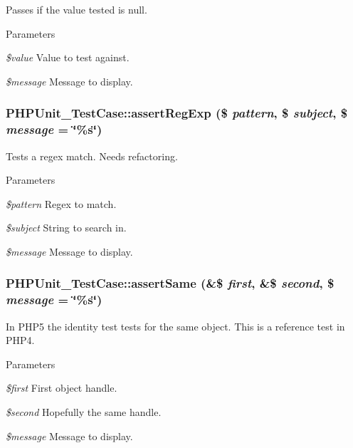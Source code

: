 \label{class_p_h_p_unit___test_case_ad8562d55d3341b088a6d90d38c1024e9}
Passes if the value tested is null. 
\begin{DoxyParams}{Parameters}
\item[{\em \$value}]Value to test against. \item[{\em \$message}]Message to display. \end{DoxyParams}
\hypertarget{class_p_h_p_unit___test_case_a2b02612d6eae4fc5ff14621019fff7e5}{
\subsubsection[{assertRegExp}]{\setlength{\rightskip}{0pt plus 5cm}PHPUnit\_\-TestCase::assertRegExp (\$ {\em pattern}, \/  \$ {\em subject}, \/  \$ {\em message} = {\ttfamily \char`\"{}\%s\char`\"{}})}}
\label{class_p_h_p_unit___test_case_a2b02612d6eae4fc5ff14621019fff7e5}
Tests a regex match. Needs refactoring. 
\begin{DoxyParams}{Parameters}
\item[{\em \$pattern}]Regex to match. \item[{\em \$subject}]String to search in. \item[{\em \$message}]Message to display. \end{DoxyParams}
\hypertarget{class_p_h_p_unit___test_case_a707c89ec40005bbf0cd002509c276ab2}{
\subsubsection[{assertSame}]{\setlength{\rightskip}{0pt plus 5cm}PHPUnit\_\-TestCase::assertSame (\&\$ {\em first}, \/  \&\$ {\em second}, \/  \$ {\em message} = {\ttfamily \char`\"{}\%s\char`\"{}})}}
\label{class_p_h_p_unit___test_case_a707c89ec40005bbf0cd002509c276ab2}
In PHP5 the identity test tests for the same object. This is a reference test in PHP4. 
\begin{DoxyParams}{Parameters}
\item[{\em \$first}]First object handle. \item[{\em \$second}]Hopefully the same handle. \item[{\em \$message}]Message to display. \end{DoxyParams}
